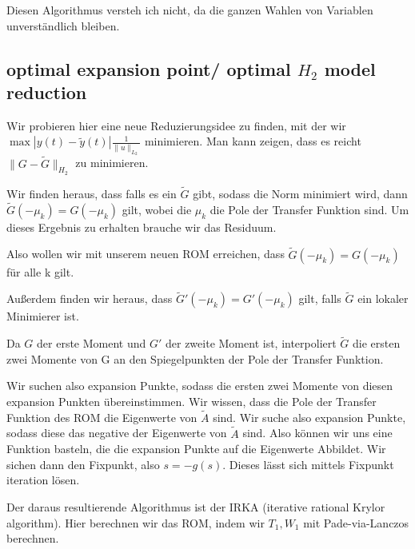 \documentclass[]{article}
\begin{document}
Diesen Algorithmus versteh ich nicht, da die ganzen Wahlen von Variablen unverständlich bleiben. 

\subsection{optimal expansion point/ optimal $H_2$  model reduction}

Wir probieren hier eine neue Reduzierungsidee zu finden, mit der wir  $\max |y(t)-\tilde{y}(t)| \frac{1}{\|u\|_{L_2}}$ minimieren. Man kann zeigen, dass es reicht  $\|G - \tilde{G}\|_{H_2}$ zu minimieren. 
 
 Wir finden heraus, dass falls es ein $\tilde{G}$ gibt, sodass die Norm minimiert wird, dann $\tilde{G}(- \mu_k)=G(- \mu_k)$ gilt, wobei die $\mu_k$ die Pole der Transfer Funktion sind.  Um dieses Ergebnis zu erhalten brauche wir das Residuum. 
 
 Also wollen wir mit unserem neuen ROM erreichen, dass $\tilde{G}(- \mu_k)=G(- \mu_k)$ für alle k gilt.   
 
 Außerdem finden wir heraus, dass $\tilde{G}'(- \mu_k)=G'(- \mu_k)$ gilt, falls $\tilde{G}$ ein lokaler Minimierer ist. 
 
 Da $G$ der erste Moment und $G'$ der zweite Moment ist, interpoliert $\tilde{G}$ die ersten zwei Momente von G an den Spiegelpunkten der Pole der Transfer Funktion. 
 
 Wir suchen also expansion Punkte, sodass die ersten zwei Momente von diesen expansion Punkten übereinstimmen. Wir wissen, dass die Pole der Transfer Funktion des ROM die Eigenwerte von $\tilde{A}$ sind. Wir suche also expansion Punkte, sodass diese das negative der Eigenwerte von $\tilde{A}$ sind. Also können wir uns eine Funktion basteln, die die expansion Punkte auf die Eigenwerte Abbildet. Wir sichen dann den Fixpunkt, also $s=-g(s)$. Dieses lässt sich mittels Fixpunkt iteration lösen.
 
 Der daraus resultierende Algorithmus ist der IRKA (iterative rational Krylor algorithm). Hier berechnen wir das ROM, indem wir $T_1, W_1$ mit Pade-via-Lanczos
 berechnen.  
 
  
  
  
  
\end{document}
